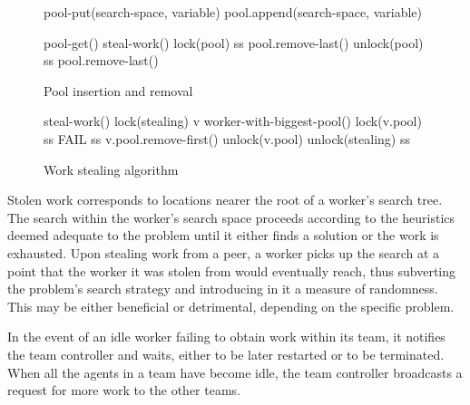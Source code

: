 \documentclass{llncs}
\begin{document}
\begin{figure}[h!t]
  \centering
  {
    \sffamily
    \begin{algorithmic}[1]
      \PROC pool-put(search-space, variable)
        \State pool.append(search-space, variable)         \label{pool:put}
      \CORP

      \Statex

      \PROC pool-get()
          \State \Return steal-work()
                            \label{pool:safe}
          \State lock(pool)
          \State ss  pool.remove-last()        \label{pool:rlast1}
          \State unlock(pool)
          \State \Return ss
        \Else
          \State \Return pool.remove-last()                \label{pool:rlast2}
        \EndIf
      \CORP
    \end{algorithmic}
  }
  \caption{Pool insertion and removal}
  \label{algo:pool-put-get}
\end{figure}

\begin{figure}[h!t]
  \centering
  {
    \sffamily
    \begin{algorithmic}[1]
      \PROC steal-work()
        \State lock(stealing)
        \State v  worker-with-biggest-pool()
        \State lock(v.pool)
                             \label{pool:thresh}
          \State ss  FAIL
        \Else
          \State ss  v.pool.remove-first()     \label{pool:rfirst}
        \EndIf
        \State unlock(v.pool)
        \State unlock(stealing)
        \State \Return ss
      \CORP
    \end{algorithmic}
  }
  \caption{Work stealing algorithm}
  \label{algo:steal}
\end{figure}

Stolen work corresponds to locations nearer the root of a worker's
search tree. The search within the worker's search space proceeds
according to the heuristics deemed adequate to the problem until it
either finds a solution or the work is exhausted. Upon stealing work
from a peer, a worker picks up the search at a point that the worker
it was stolen from would eventually reach, thus subverting the
problem's search strategy and introducing in it a measure of
randomness. This may be either beneficial or detrimental, depending on
the specific problem.

In the event of an idle worker failing to obtain work within its team,
it notifies the team controller and waits, either to be later restarted or
to be terminated. When all the agents in a team have become idle, the
team controller broadcasts a request for more work to the other teams.
\end{document}
